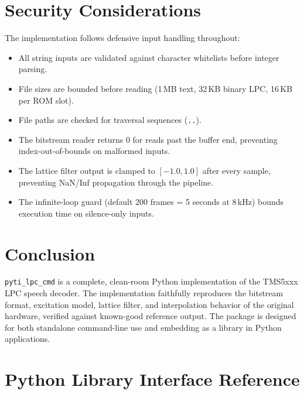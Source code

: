 \documentclass[10pt]{article}
\begin{document}
\section{Security Considerations}
\label{sec:security}

The implementation follows defensive input handling throughout:

\begin{itemize}[noitemsep]
\item All string inputs are validated against character whitelists before
  integer parsing.
\item File sizes are bounded before reading (1\,MB text, 32\,KB binary LPC,
  16\,KB per ROM slot).
\item File paths are checked for traversal sequences (\texttt{..}).
\item The bitstream reader returns 0 for reads past the buffer end, preventing
  index-out-of-bounds on malformed inputs.
\item The lattice filter output is clamped to $[-1.0, 1.0]$ after every
  sample, preventing NaN/Inf propagation through the pipeline.
\item The infinite-loop guard (default 200 frames = 5 seconds at 8\,kHz)
  bounds execution time on silence-only inputs.
\end{itemize}

\section{Conclusion}
\label{sec:conclusion}

\texttt{pyti\_lpc\_cmd} is a complete, clean-room Python implementation of the
TMS5xxx LPC speech decoder.  The implementation faithfully reproduces the
bitstream format, excitation model, lattice filter, and interpolation behavior
of the original hardware, verified against known-good reference output.  The
package is designed for both standalone command-line use and embedding as a
library in Python applications.

\clearpage
\appendix
\appendixpage

\section{Python Library Interface Reference}
\label{app:libapi}
\end{document}
